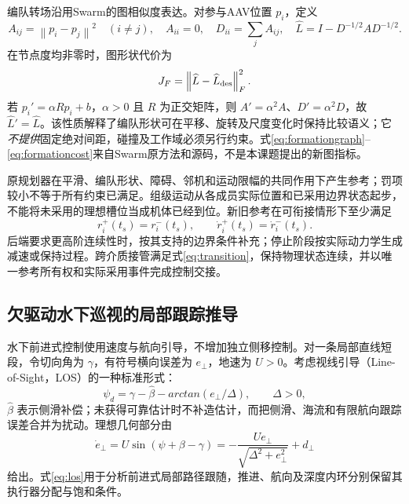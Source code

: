 \documentclass[UTF8,fontset=fandol,a4paper,11pt]{ctexart}
\newcommand{\norm}[1]{\left\lVert #1\right\rVert}
\begin{document}
编队转场沿用Swarm的图相似度表达\cite{swarm}。对参与AAV位置 $p_i$，定义
\begin{equation}
 A_{ij}=\norm{p_i-p_j}^2\quad(i\ne j),\quad A_{ii}=0,
 \quad D_{ii}=\sum_j A_{ij},\quad
 \widehat L=I-D^{-1/2}AD^{-1/2}.
 \label{eq:formationgraph}
\end{equation}
在节点度均非零时，图形状代价为
\begin{equation}
 J_F=\norm{\widehat L-\widehat L_{\rm des}}_F^2.
 \label{eq:formationcost}
\end{equation}
若 $p_i'=\alpha Rp_i+b$，$\alpha>0$ 且 $R$ 为正交矩阵，则 $A'=\alpha^2A$、$D'=\alpha^2D$，故 $\widehat L'=\widehat L$。该性质解释了编队形状可在平移、旋转及尺度变化时保持比较语义；它\emph{不提供}固定绝对间距，碰撞及工作域必须另行约束。式\eqref{eq:formationgraph}--\eqref{eq:formationcost}来自Swarm原方法和源码，不是本课题提出的新图指标。

原规划器在平滑、编队形状、障碍、邻机和运动限幅的共同作用下产生参考；罚项较小不等于所有约束已满足。组级运动从各成员实际位置和已采用边界状态起步，不能将未采用的理想槽位当成机体已经到位。新旧参考在可衔接情形下至少满足
\begin{equation}
 r_i^+(t_s)=r_i^-(t_s),\qquad
 \dot r_i^+(t_s)=\dot r_i^-(t_s).
 \label{eq:referencecontinuity}
\end{equation}
后端要求更高阶连续性时，按其支持的边界条件补充；停止阶段按实际动力学生成减速或保持过程。跨介质接管满足式\eqref{eq:transition}，保持物理状态连续，并以唯一参考所有权和实际采用事件完成控制交接。

\subsection{欠驱动水下巡视的局部跟踪推导}

水下前进式控制使用速度与航向引导，不增加独立侧移控制。对一条局部直线短段，令切向角为 $\gamma$，有符号横向误差为 $e_\perp$，地速为 $U>0$。考虑视线引导（Line-of-Sight，LOS）的一种标准形式\cite{los2014}：
\begin{equation}
 \psi_d=\gamma-\widehat\beta-arctan(e_\perp/\Delta),
       \qquad \Delta>0,
 \label{eq:los}
\end{equation}
$\widehat\beta$ 表示侧滑补偿；未获得可靠估计时不补造估计，而把侧滑、海流和有限航向跟踪误差合并为扰动。理想几何部分由
\begin{equation}
 \dot e_\perp=U\sin(\psi+\beta-\gamma)
       =-\frac{Ue_\perp}{\sqrt{\Delta^2+e_\perp^2}}+d_\perp
 \label{eq:loserror}
\end{equation}
给出。式\eqref{eq:los}用于分析前进式局部路径跟随，推进、航向及深度内环分别保留其执行器分配与饱和条件。
\end{document}
